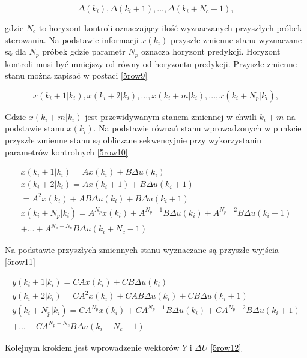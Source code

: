\begin{equation}
\label{5row8} 
\Delta(k_i),\Delta(k_i+1), ..., \Delta(k_i+N_c-1),
\end{equation}

gdzie $N_c$ to horyzont kontroli oznaczający ilość wyznaczanych przyszłych próbek sterowania. Na podstawie informacji $x(k_i)$ przyszłe zmienne stanu wyznaczane są dla $N_p$ próbek gdzie parametr $N_p$ oznacza horyzont predykcji. Horyzont kontroli musi być mniejszy od równy od horyzontu predykcji.
Przyszłe zmienne stanu można zapisać w postaci \ref{5row9}

\begin{equation}
\label{5row9} 
x(k_i+1|k_i),x(k_i+2|k_i),...,x(k_i+m|k_i),...,x(k_i+N_p|k_i),
\end{equation}

Gdzie $x(k_i+m|k_i)$ jest przewidywanym stanem zmiennej w chwili $k_i+m$ na podstawie stanu $x(k_i)$. Na podstawie równań stanu wprowadzonych w punkcie \label{mpc_ss} przyszłe zmienne stanu są obliczane sekwencyjnie przy wykorzystaniu parametrów kontrolnych \ref{5row10}


 \begin{gather}
 \label{5row10}
x(k_i+1|k_i)=Ax(k_i)+B\Delta u(k_i) \\
\nonumber x(k_i+2|k_i)=Ax(k_i+1)+B\Delta u(k_i+1) \\
\nonumber =A^2x(k_i)+AB\Delta u(k_i)+B\Delta u(k_i+1) \\
\nonumber x(k_i+N_p|k_i)=A^{N_p}x(k_i)+A^{N_p-1}B\Delta u(k_i)+A^{N_p-2}B\Delta u(k_i+1) \\
\nonumber + ... + A^{N_p -N_c}B\Delta u(k_i+N_c-1)
\end{gather}

Na podstawie przyszłych zmiennych stanu wyznaczane są przyszłe wyjścia \ref{5row11}


\begin{gather}
\label{5row11}
y(k_i+1|k_i)=CAx(k_i)+CB\Delta u(k_i) \\
\nonumber y(k_i+2|k_i)=CA^2x(k_i)+CAB\Delta u(k_i)+CB\Delta u(k_i+1) \\
\nonumber y(k_i+N_p|k_i)=CA^{N_p}x(k_i)+CA^{N_p-1}B\Delta u(k_i)+CA^{N_p-2}B\Delta u(k_i+1) \\
\nonumber + ... + CA^{N_p -N_c}B\Delta u(k_i+N_c-1)
\end{gather}

Kolejnym krokiem jest wprowadzenie wektorów $Y$ i $\Delta U$ \ref{5row12}


